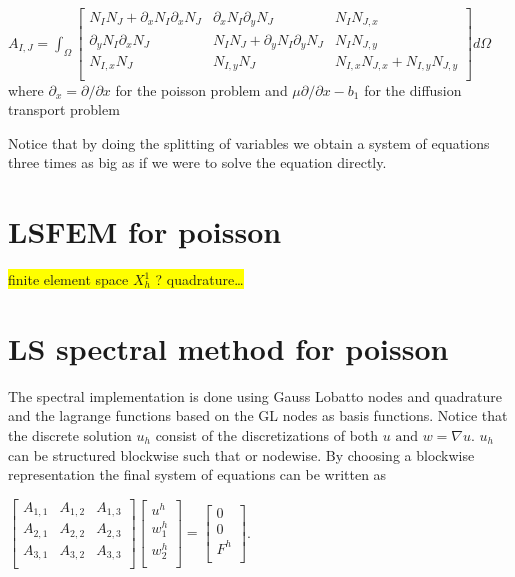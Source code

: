 $A_{I,J} = \int_{\Omega}
\begin{bmatrix}
	N_IN_J + \partial_x N_{I} \partial_xN_{J} & \partial_x N_{I}\partial_y N_{J} & N_IN_{J,x} \\ 	
	\partial_yN_{I}\partial_xN_{J} &N_IN_J + \partial_yN_{I}\partial_yN_{J} &  N_IN_{J,y} \\ 	
	N_{I,x}N_J & N_{I,y}N_J & N_{I,x}N_{J,x} + N_{I,y}N_{J,y} \\ 	
	\label{mat:basicPoisson}
\end{bmatrix}
d\Omega$
where $\partial_x = \partial / \partial x $ for the poisson problem and $\mu \partial / \partial x - b_1$ for the diffusion transport problem 

Notice that by doing the splitting of variables we obtain a system of equations three times as big as if we were to solve the equation directly. 

\section{LSFEM for poisson}
\colorbox{yellow}{finite element space $X_h^1$ ? quadrature\ldots  }
\section{LS spectral method for poisson}

The spectral implementation is done using Gauss Lobatto nodes and quadrature and the lagrange functions based on the GL nodes as basis functions. 
Notice that the discrete solution $u_h$ consist of the discretizations of both $u \text{ and } w = \nabla u$. $u_h$ can be structured blockwise such that or nodewise. By choosing a blockwise representation the final system of equations can be written as 

$
\begin{bmatrix}
	A_{1,1} & A_{1,2} &	A_{1,3} \\ 	
	A_{2,1} & A_{2,2} & A_{2,3} \\ 	
	A_{3,1} & A_{3,2} & A_{3,3} \\ 	
\end{bmatrix}
\begin{bmatrix}
 u^h \\ 	
 w^h_1\\ 	
 w^h_2\\ 	
\end{bmatrix}
=
\begin{bmatrix}
 0 \\ 	
 0\\ 	
 F^h\\ 	
\end{bmatrix}
$.

